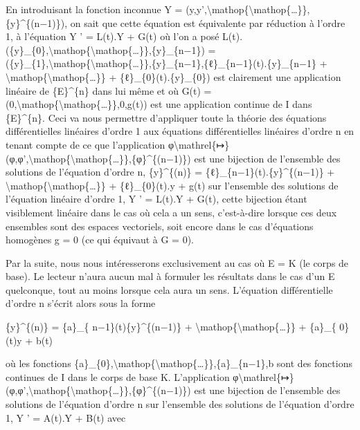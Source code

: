 \documentclass[]{article}
\begin{document}
En introduisant la fonction inconnue Y =
(y,y',\textbackslash{}mathop\{\textbackslash{}mathop\{\ldots{}\}\},\{y\}\^{}\{(n−1)\}),
on sait que cette équation est équivalente par réduction à l'ordre 1, à
l'équation Y ' = L(t).Y + G(t) où l'on a posé
L(t).(\{y\}\_\{0\},\textbackslash{}mathop\{\textbackslash{}mathop\{\ldots{}\}\},\{y\}\_\{n−1\})
=
(\{y\}\_\{1\},\textbackslash{}mathop\{\textbackslash{}mathop\{\ldots{}\}\},\{y\}\_\{n−1\},\{ℓ\}\_\{n−1\}(t).\{y\}\_\{n−1\}
+ \textbackslash{}mathop\{\textbackslash{}mathop\{\ldots{}\}\} +
\{ℓ\}\_\{0\}(t).\{y\}\_\{0\}) est clairement une application linéaire de
\{E\}\^{}\{n\} dans lui même et où G(t) =
(0,\textbackslash{}mathop\{\textbackslash{}mathop\{\ldots{}\}\},0,g(t))
est une application continue de I dans \{E\}\^{}\{n\}. Ceci va nous
permettre d'appliquer toute la théorie des équations différentielles
linéaires d'ordre 1 aux équations différentielles linéaires d'ordre n en
tenant compte de ce que l'application
φ\textbackslash{}mathrel\{↦\}(φ,φ',\textbackslash{}mathop\{\textbackslash{}mathop\{\ldots{}\}\},\{φ\}\^{}\{(n−1)\})
est une bijection de l'ensemble des solutions de l'équation d'ordre n,
\{y\}\^{}\{(n)\} = \{ℓ\}\_\{n−1\}(t).\{y\}\^{}\{(n−1)\} +
\textbackslash{}mathop\{\textbackslash{}mathop\{\ldots{}\}\} +
\{ℓ\}\_\{0\}(t).y + g(t) sur l'ensemble des solutions de l'équation
linéaire d'ordre 1, Y ' = L(t).Y + G(t), cette bijection étant
visiblement linéaire dans le cas où cela a un sens, c'est-à-dire lorsque
ces deux ensembles sont des espaces vectoriels, soit encore dans le cas
d'équations homogènes g = 0 (ce qui équivaut à G = 0).

Par la suite, nous nous intéresserons exclusivement au cas où E = K (le
corps de base). Le lecteur n'aura aucun mal à formuler les résultats
dans le cas d'un E quelconque, tout au moins lorsque cela aura un sens.
L'équation différentielle d'ordre n s'écrit alors sous la forme

\{y\}\^{}\{(n)\} = \{a\}\_\{ n−1\}(t)\{y\}\^{}\{(n−1)\} +
\textbackslash{}mathop\{\textbackslash{}mathop\{\ldots{}\}\} + \{a\}\_\{
0\}(t)y + b(t)

où les fonctions
\{a\}\_\{0\},\textbackslash{}mathop\{\textbackslash{}mathop\{\ldots{}\}\},\{a\}\_\{n−1\},b
sont des fonctions continues de I dans le corps de base K. L'application
φ\textbackslash{}mathrel\{↦\}(φ,φ',\textbackslash{}mathop\{\textbackslash{}mathop\{\ldots{}\}\},\{φ\}\^{}\{(n−1)\})
est une bijection de l'ensemble des solutions de l'équation d'ordre n
sur l'ensemble des solutions de l'équation d'ordre 1, Y ' = A(t).Y +
B(t) avec
\end{document}
